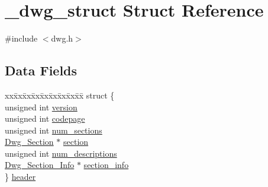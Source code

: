 \hypertarget{struct__dwg__struct}{\section{\-\_\-dwg\-\_\-struct \-Struct \-Reference}
\label{struct__dwg__struct}
}


{\ttfamily \#include $<$dwg.\-h$>$}

\subsection*{\-Data \-Fields}
\begin{DoxyCompactItemize}
\item 
\begin{tabbing}
xx\=xx\=xx\=xx\=xx\=xx\=xx\=xx\=xx\=\kill
struct \{\\
\>unsigned int \hyperlink{struct__dwg__struct_a3894b5d2a325285dc2af923dd73133cb}{version}\\
\>unsigned int \hyperlink{struct__dwg__struct_acf3fb73d5fa22acc30308a90d891b845}{codepage}\\
\>unsigned int \hyperlink{struct__dwg__struct_ac19f9ea62b09647a1a72ced8606c543d}{num\_sections}\\
\>\hyperlink{dwg_8h_a866c3e57d707d1f038f00d83684cb229}{Dwg\_Section} $\ast$ \hyperlink{struct__dwg__struct_afc13713550410bb84affb041cf0ecb61}{section}\\
\>unsigned int \hyperlink{struct__dwg__struct_a5870c954f8e728eb0f85ecc09c455ddb}{num\_descriptions}\\
\>\hyperlink{structDwg__Section__Info}{Dwg\_Section\_Info} $\ast$ \hyperlink{struct__dwg__struct_a0930ee94a7beb2f53d1ba8d1a993bc55}{section\_info}\\
\} \hyperlink{struct__dwg__struct_acc696e765bcac44e44f4b571866b079b}{header}\\


\end{tabbing}
\end{DoxyCompactItemize}
